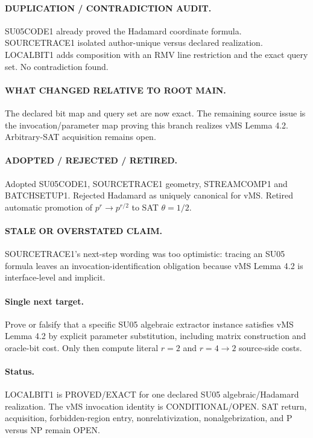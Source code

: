 \documentclass[11pt]{article}
\begin{document}
\paragraph{DUPLICATION / CONTRADICTION AUDIT.}
SU05CODE1 already proved the Hadamard coordinate formula. SOURCETRACE1 isolated author-unique versus declared realization. LOCALBIT1 adds composition with an RMV line restriction and the exact query set. No contradiction found.

\paragraph{WHAT CHANGED RELATIVE TO ROOT MAIN.}
The declared bit map and query set are now exact. The remaining source issue is the invocation/parameter map proving this branch realizes vMS Lemma 4.2. Arbitrary-SAT acquisition remains open.

\paragraph{ADOPTED / REJECTED / RETIRED.}
Adopted SU05CODE1, SOURCETRACE1 geometry, STREAMCOMP1 and BATCHSETUP1. Rejected Hadamard as uniquely canonical for vMS. Retired automatic promotion of \(p^r\to p^{r/2}\) to SAT \(\theta=1/2\).

\paragraph{STALE OR OVERSTATED CLAIM.}
SOURCETRACE1's next-step wording was too optimistic: tracing an SU05 formula leaves an invocation-identification obligation because vMS Lemma 4.2 is interface-level and implicit.

\paragraph{Single next target.}
Prove or falsify that a specific SU05 algebraic extractor instance satisfies vMS Lemma 4.2 by explicit parameter substitution, including matrix construction and oracle-bit cost. Only then compute literal \(r=2\) and \(r=4\to2\) source-side costs.

\paragraph{Status.}
LOCALBIT1 is PROVED/EXACT for one declared SU05 algebraic/Hadamard realization. The vMS invocation identity is CONDITIONAL/OPEN. SAT return, acquisition, forbidden-region entry, nonrelativization, nonalgebrization, and P versus NP remain OPEN.
\end{document}
